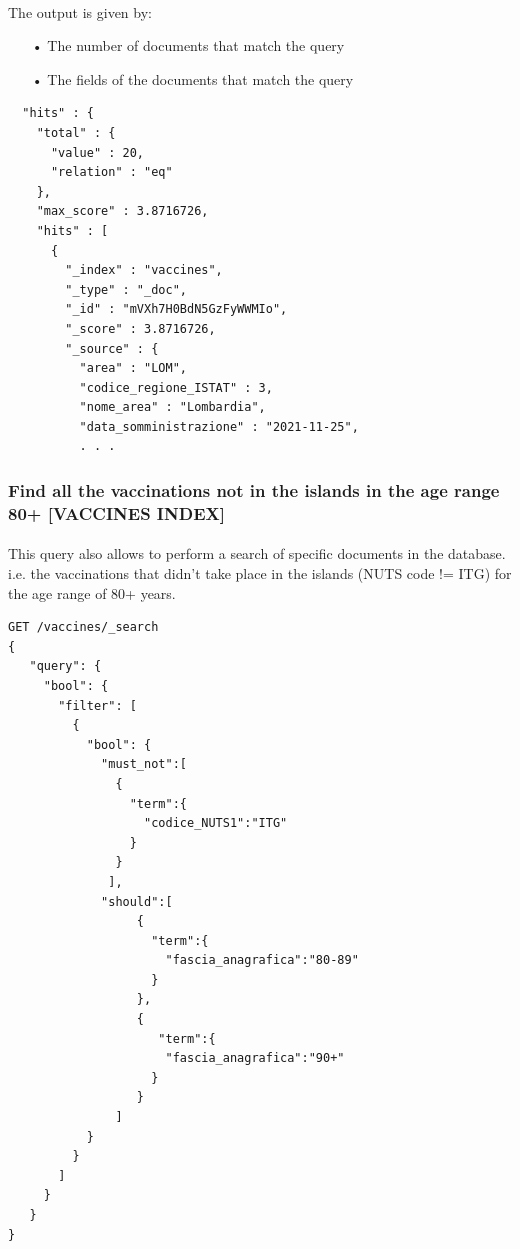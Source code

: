 \documentclass[a4paper,12pt]{article}
\begin{document}
\paragraph{} The output is given by: 
\begin{itemize}[noitemsep]
\item[•] The number of documents that match the query
\item[•] The fields of the documents that match the query
\end{itemize}
\begin{tcolorbox}[colback=red!5!white,colframe=red!75!black,title=OUTPUT]
\begin{verbatim}
  "hits" : {
    "total" : {
      "value" : 20,
      "relation" : "eq"
    },
    "max_score" : 3.8716726,
    "hits" : [
      {
        "_index" : "vaccines",
        "_type" : "_doc",
        "_id" : "mVXh7H0BdN5GzFyWWMIo",
        "_score" : 3.8716726,
        "_source" : {
          "area" : "LOM",
          "codice_regione_ISTAT" : 3,
          "nome_area" : "Lombardia",
          "data_somministrazione" : "2021-11-25",
          . . .
\end{verbatim}
\end{tcolorbox}
\newpage

\subsubsection{Find all the vaccinations not in the islands in the age range 80+ [VACCINES INDEX]}
\paragraph{} This query also allows to perform a search of specific documents in the database. i.e. the vaccinations that didn't take place in the islands (NUTS code != ITG) for the age range of 80+ years. 
\begin{tcolorbox}[colback=green!5!white,colframe=green!75!black,title=QUERY]
\begin{verbatim}
GET /vaccines/_search
{  
   "query": {
     "bool": {
       "filter": [
         {
           "bool": {
             "must_not":[
               {
                 "term":{
                   "codice_NUTS1":"ITG"
                 }
               }
              ],
             "should":[  
                  {
                    "term":{
                      "fascia_anagrafica":"80-89"
                    }
                  },
                  {  
                     "term":{
                      "fascia_anagrafica":"90+"
                    }
                  }
               ]
           }
         }
       ]
     }
   }
}
\end{verbatim}
\end{tcolorbox}
\newpage
\end{document}
